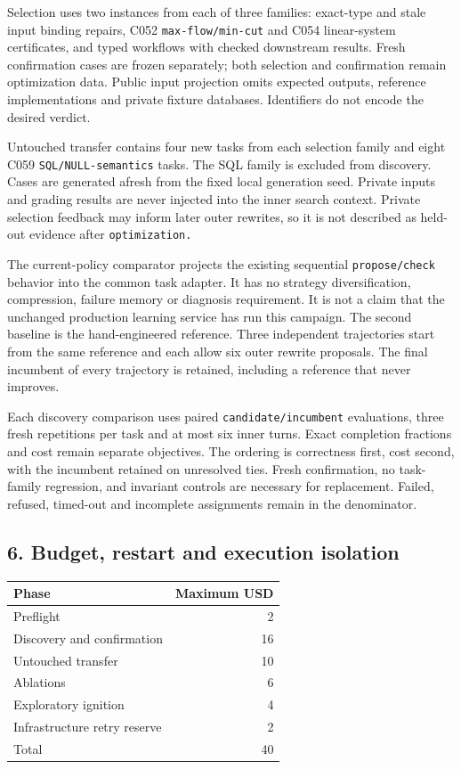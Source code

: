 \documentclass[
  11pt,
]{article}
\begin{document}
Selection uses two instances from each of three families: exact-type and
stale input binding repairs, C052 \nolinkurl{max-flow/min-cut} and C054
linear-system certificates, and typed workflows with checked downstream
results. Fresh confirmation cases are frozen separately; both selection
and confirmation remain optimization data. Public input projection omits
expected outputs, reference implementations and private fixture
databases. Identifiers do not encode the desired verdict.

Untouched transfer contains four new tasks from each selection family
and eight C059 \nolinkurl{SQL/NULL-semantics} tasks. The SQL family is
excluded from discovery. Cases are generated afresh from the fixed local
generation seed. Private inputs and grading results are never injected
into the inner search context. Private selection feedback may inform
later outer rewrites, so it is not described as held-out evidence after
\nolinkurl{optimization.}

The current-policy comparator projects the existing sequential
\nolinkurl{propose/check} behavior into the common task adapter. It has
no strategy diversification, compression, failure memory or diagnosis
requirement. It is not a claim that the unchanged production learning
service has run this campaign. The second baseline is the
hand-engineered reference. Three independent trajectories start from the
same reference and each allow six outer rewrite proposals. The final
incumbent of every trajectory is retained, including a reference that
never improves.

Each discovery comparison uses paired \nolinkurl{candidate/incumbent}
evaluations, three fresh repetitions per task and at most six inner
turns. Exact completion fractions and cost remain separate objectives.
The ordering is correctness first, cost second, with the incumbent
retained on unresolved ties. Fresh confirmation, no task-family
regression, and invariant controls are necessary for replacement.
Failed, refused, timed-out and incomplete assignments remain in the
denominator.

\subsection{6. Budget, restart and execution
isolation}\label{budget-restart-and-execution-isolation}

\begin{longtable}[]{@{}lr@{}}
\toprule\noalign{}
Phase & Maximum USD \\
\midrule\noalign{}
\endhead
\bottomrule\noalign{}
\endlastfoot
Preflight & 2 \\
Discovery and confirmation & 16 \\
Untouched transfer & 10 \\
Ablations & 6 \\
Exploratory ignition & 4 \\
Infrastructure retry reserve & 2 \\
Total & 40 \\
\end{longtable}
\end{document}
